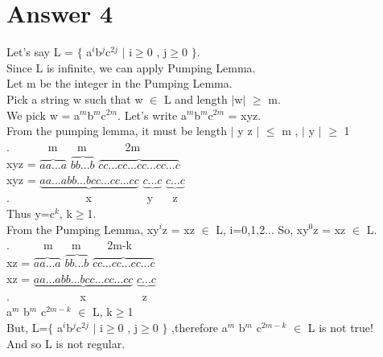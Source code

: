 \documentclass[12pt]{article}
\begin{document}
\section*{Answer 4}
Let's say L = $\lbrace$ a$^i$b$^j$c$^{2j}$ $\vert$ i$\geq$0 , j$\geq$0 $\rbrace$. \\
Since L is infinite, we can apply Pumping Lemma. \\
Let m be the integer in the Pumping Lemma. \\
Pick a string w such that w $\in$ L and length $\vert$w$\vert$ $\geq$ m. \\
We pick w = a$^m$b$^m$c$^{2m}$. Let's write a$^m$b$^m$c$^{2m}$ = xyz. \\
From the pumping lemma, it must be length $\vert$ y z $\vert$ $\leq$ m , $\vert$ y $\vert$ $\geq$ 1 \\
.$\hspace{41pt}$m$\hspace{21pt}$m$\hspace{41pt}$2m \\	
xyz = $\overbrace{aa...a}$ $\overbrace{bb...b}$ $\overbrace{cc...cc...cc...cc...c}$ \\
xyz = $\underbrace{aa...abb...bcc...cc...cc}$ $\underbrace{c...c}$ $\underbrace{c...c}$ \\
.$\hspace{81pt}$x$\hspace{59pt}$y$\hspace{21pt}$z \\
Thus  y=c$^k$, k$\geq$1. \\
From the Pumping Lemma, xy$^i$z = xz $\in$ L, i=0,1,2... So, xy$^0$z = xz $\in$ L. \\
.$\hspace{36pt}$m$\hspace{20pt}$m$\hspace{28pt}$2m-k \\
xz = $\overbrace{aa...a}$ $\overbrace{bb...b}$ $\overbrace{cc...cc...cc...c}$ \\
xz = $\underbrace{aa...abb...bcc...cc...cc}$ $\underbrace{c...c}$ \\
.$\hspace{75pt}$x$\hspace{60pt}$z \\
a$^m$ b$^m$ c$^{2m-k}$ $\in$ L, k$\geq$1 \\
But, L=$\lbrace$ a$^i$b$^j$c$^{2j}$ $\vert$ i$\geq$0 , j$\geq$0 $\rbrace$ ,therefore a$^m$ b$^m$ c$^{2m-k}$ $\in$ L is not true! \\
And so L is not regular. \\
\end{document}
